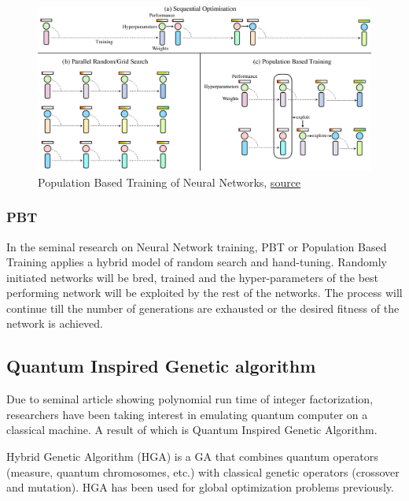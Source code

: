 \begin{figure}
	\includegraphics[width=1.0\columnwidth]{introduction/fig1j.png}
	\caption{Population Based Training of Neural Networks, \href{https://www.semanticscholar.org/paper/Population-Based-Training-of-Neural-Networks-Jaderberg-Dalibard/7a0b1f7fe39629360f1766a480dd8903065a2854/figure/0}{source}}
\end{figure}


\subsubsection{PBT}
In the seminal research on Neural Network training\cite{jaderberg2017population}, PBT or Population Based Training applies a hybrid model of random search and hand-tuning. Randomly initiated networks will be bred, trained and the hyper-parameters of the best performing network will be exploited by the rest of the networks. The process will continue till the number of generations are exhausted or the desired fitness of the network is achieved. 


\subsection{Quantum Inspired Genetic algorithm}
Due to seminal article showing polynomial run time of integer factorization\cite{shor1999polynomial}, researchers have been taking interest in emulating quantum computer on a classical machine. A result of which is Quantum Inspired Genetic Algorithm\cite{udrescu2006implementing}. 

Hybrid Genetic Algorithm (HGA)\cite{wang2005hybrid} is a GA that combines quantum operators (measure, quantum chromosomes, etc.) with classical genetic operators (crossover and mutation). HGA has been used for global optimization problems previously\cite{gonccalves2005hybrid}\cite{kim2007hybrid}\cite{kao2008hybrid}.



